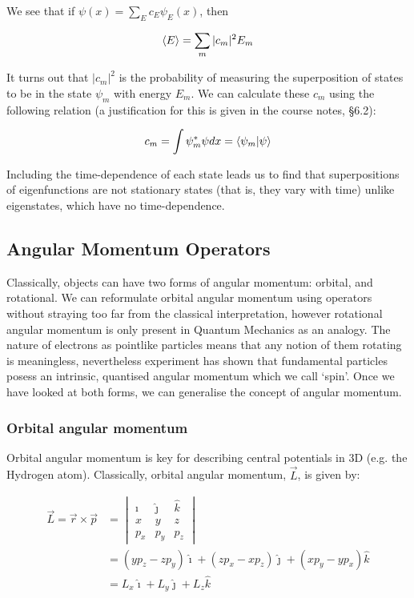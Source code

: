 We see that if $\psi(x) = \sum_E c_E \psi_E(x) $, then 

\[ \expval{E} = \sum_m |c_m|^2E_m \]

It turns out that $|c_m|^2$ is the probability of measuring the superposition of states to be in the state $\psi_m$ with energy $E_m$. We can calculate these $c_m$ using the following relation (a justification for this is given in the course notes, §6.2):

\[ c_m = \int\psi^*_m\psi dx = \bra{\psi_m}\ket{\psi}\]

Including the time-dependence of each state leads us to find that superpositions of eigenfunctions are not stationary states (that is, they vary with time) unlike eigenstates, which have no time-dependence. 

\subsection{Angular Momentum Operators}

Classically, objects can have two forms of angular momentum: orbital, and rotational. We can reformulate orbital angular momentum using operators without straying too far from the classical interpretation, however rotational angular momentum is only present in Quantum Mechanics as an analogy. The nature of electrons as pointlike particles means that any notion of them rotating is meaningless, nevertheless experiment has shown that fundamental particles posess an intrinsic, quantised angular momentum which we call `spin'. Once we have looked at both forms, we can generalise the concept of angular momentum.

\subsubsection{Orbital angular momentum}

Orbital angular momentum is key for describing central potentials in 3D (e.g. the Hydrogen atom). Classically, orbital angular momentum, $\vec{L}$, is given by:

\begin{align*} \vec{L} = \vec{r} \times \vec{p} &= \begin{vmatrix} \hat{\imath} & \hat{\jmath} & \hat{k} \\ x & y & z \\ p_x & p_y & p_z \end{vmatrix} \\ &= (yp_z - zp_y)\hat{\imath} + (zp_x - xp_z)\hat{\jmath} + (xp_y - yp_x)\hat{k} \\ &= L_x \hat{\imath} + L_y \hat{\jmath} + L_z \hat{k} 
\end{align*}

